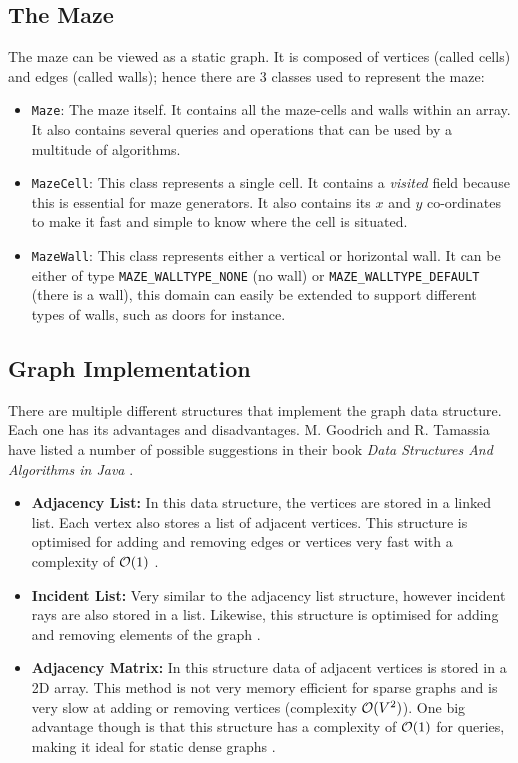 \subsection{The Maze}
The maze can be viewed as a static graph. It is composed of vertices (called cells) and edges (called walls); hence there are 3 classes used to represent the maze:
\begin{itemize}
\item \texttt{Maze}: The maze itself. It contains all the maze-cells and walls within an array. It also contains several queries and operations that can be used by a multitude of algorithms.
\item \texttt{MazeCell}: This class represents a single cell. It contains a {\em visited} field because this is essential for maze generators. It also contains its $x$ and $y$ co-ordinates to make it fast and simple to know where the cell is situated.
\item \texttt{MazeWall}: This class represents either a vertical or horizontal wall. It can be either of type 
\texttt{MAZE\_WALLTYPE\_NONE} (no wall) or \texttt{MAZE\_WALLTYPE\_DEFAULT} (there is a wall), this domain can easily be extended to support different types of walls, such as doors for instance.
\end{itemize}

\subsection{Graph Implementation}

There are multiple different structures that implement the graph data structure. Each one has its advantages and disadvantages. M. Goodrich and R. Tamassia have listed a number of possible suggestions in their book {\em  Data Structures And Algorithms in Java} \citep{DSAJ-4}.
\begin{itemize}
\item {\bf Adjacency List:} In this data structure, the vertices are stored in a linked list. Each vertex also stores a list of adjacent vertices. This structure is optimised for adding and removing edges or vertices very fast with a complexity of $\mathcal{O} (1)$ \citep{DSAJ-4}.
\item {\bf Incident List:} Very similar to the adjacency list structure, however incident rays are also stored in a list. Likewise, this structure is optimised for adding and removing elements of the graph \citep{DSAJ-4}.
\item {\bf Adjacency Matrix:} In this structure data of adjacent vertices is stored in a 2D array. This method is not very memory efficient for sparse graphs and is very slow at adding or removing vertices (complexity $\mathcal{O} (V^2)$). One big advantage though is that this structure has a complexity of $\mathcal{O} (1)$ for queries, making it ideal for static dense graphs \citep{DSAJ-4}.
\end{itemize}

